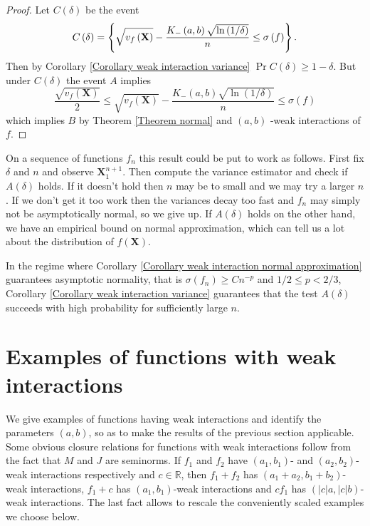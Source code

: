 \documentclass[final,12pt]{colt2018} %
\begin{document}
		
		\begin{proof}
			Let $C\left( \delta \right) $ be the event%
			\begin{equation*}
			C\left( \delta \right) =\left\{ \sqrt{v_{f}\left( \mathbf{X}\right) }-\frac{%
				K_{-}\left( a,b\right) \sqrt{\ln \left( 1/\delta \right) }}{n}\leq \sigma
			\left( f\right) \right\} . 
			\end{equation*}%
			Then by Corollary \ref{Corollary weak interaction variance} $\Pr C\left(
			\delta \right) \geq 1-\delta $. But under $C\left( \delta \right) $ the
			event $A$ implies%
			\begin{equation*}
			\frac{\sqrt{v_{f}\left( \mathbf{X}\right) }}{2}\leq \sqrt{v_{f}\left( 
				\mathbf{X}\right) }-\frac{K_{-}\left( a,b\right) \sqrt{\ln \left( 1/\delta
					\right) }}{n}\leq \sigma \left( f\right) 
			\end{equation*}%
			which implies $B$ by Theorem \ref{Theorem normal} and $\left( a,b\right) $%
			-weak interactions of $f$.
		\end{proof}
		
		On a sequence of functions $f_{n}$ this result could be put to work as
		follows. First fix $\delta $ and $n$ and observe $\mathbf{X}_{1}^{n+1}$.
		Then compute the variance estimator and check if $A\left( \delta \right) $
		holds. If it doesn't hold then $n$ may be to small and we may try a larger $%
		n $. If we don't get it too work then the variances decay too fast and $f_{n}
		$ may simply not be asymptotically normal, so we give up. If $A\left( \delta
		\right) $ holds on the other hand, we have an empirical bound on normal
		approximation, which can tell us a lot about the distribution of $f\left( 
		\mathbf{X}\right) $.
		
		In the regime where Corollary \ref{Corollary weak interaction normal
			approximation} guarantees asymptotic normality, that is $\sigma \left(
		f_{n}\right) \geq Cn^{-p}$ and $1/2\leq p<2/3$, Corollary \ref{Corollary
			weak interaction variance} guarantees that the test $A\left( \delta \right) $
		succeeds with high probability for sufficiently large $n$.
		
		\section{Examples of functions with weak interactions\label{Section Functions with weak
				interactions}}
		
		We give examples of functions having weak interactions and identify the
		parameters $\left( a,b\right) $, so as to make the results of the previous
		section applicable. Some obvious closure relations for functions with weak
		interactions follow from the fact that $M$ and $J$ are seminorms. If $f_{1}$
		and $f_{2}$ have $\left( a_{1},b_{1}\right) $- and $\left(
		a_{2},b_{2}\right) $-weak interactions respectively and $c\in 
		\mathbb{R}
		$, then $f_{1}+f_{2}$ has $\left( a_{1}+a_{2},b_{1}+b_{2}\right) $-weak
		interactions, $f_{1}+c$ has $\left( a_{1},b_{1}\right) $-weak interactions
		and $cf_{1}$ has $\left( \vert c\vert a,\vert c\vert b\right) $-weak interactions. The last fact
		allows to rescale the conveniently scaled examples we choose below.
		
\end{document}

